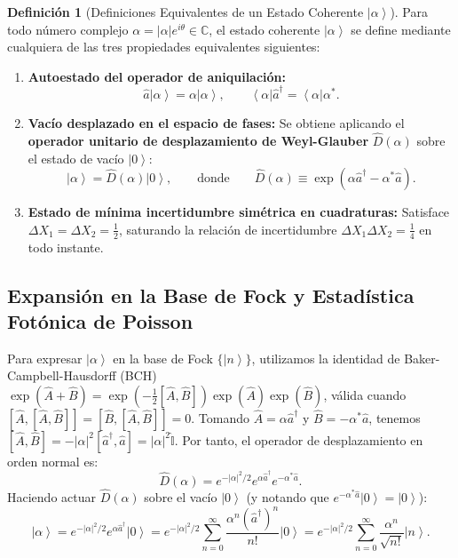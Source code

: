 \documentclass[11pt,a4paper,twoside]{report}
\theoremstyle{definition}
\newtheorem{definicion}{Definición}[chapter]
\theoremstyle{plain}
\theoremstyle{remark}
\newcommand{\ket}[1]{\left| #1 \right\rangle}
\newcommand{\bra}[1]{\left\langle #1 \right|}
\newcommand{\comm}[2]{\left[ #1, #2 \right]}
\newcommand{\op}[1]{\hat{#1}}
\newcommand{\ident}{\hat{\mathbb{I}}}
\begin{document}
\begin{definicion}[Definiciones Equivalentes de un Estado Coherente $\ket{\alpha}$]
Para todo número complejo $\alpha = |\alpha|e^{i\theta} \in \mathbb{C}$, el estado coherente $\ket{\alpha}$ se define mediante cualquiera de las tres propiedades equivalentes siguientes:
\begin{enumerate}[label=\textbf{D\arabic*.}]
    \item \textbf{Autoestado del operador de aniquilación:}
    \begin{equation}
        \op{a}\ket{\alpha} = \alpha\ket{\alpha}, \qquad \bra{\alpha}\op{a}^\dagger = \bra{\alpha}\alpha^*.
    \end{equation}
    \item \textbf{Vacío desplazado en el espacio de fases:} Se obtiene aplicando el \textbf{operador unitario de desplazamiento de Weyl-Glauber} $\op{D}(\alpha)$ sobre el estado de vacío $\ket{0}$:
    \begin{equation}
        \ket{\alpha} = \op{D}(\alpha)\ket{0}, \qquad \text{donde} \qquad \op{D}(\alpha) \equiv \exp\left(\alpha\op{a}^\dagger - \alpha^*\op{a}\right).
    \end{equation}
    \item \textbf{Estado de mínima incertidumbre simétrica en cuadraturas:} Satisface $\Delta X_1 = \Delta X_2 = \frac{1}{2}$, saturando la relación de incertidumbre $\Delta X_1 \Delta X_2 = \frac{1}{4}$ en todo instante.
\end{enumerate}
\end{definicion}

\subsection{Expansión en la Base de Fock y Estadística Fotónica de Poisson}

Para expresar $\ket{\alpha}$ en la base de Fock $\{\ket{n}\}$, utilizamos la identidad de Baker-Campbell-Hausdorff (BCH) $\exp(\op{A}+\op{B}) = \exp(-\frac{1}{2}\comm{\op{A}}{\op{B}})\exp(\op{A})\exp(\op{B})$, válida cuando $\comm{\op{A}}{\comm{\op{A}}{\op{B}}} = \comm{\op{B}}{\comm{\op{A}}{\op{B}}} = 0$. Tomando $\op{A} = \alpha\op{a}^\dagger$ y $\op{B} = -\alpha^*\op{a}$, tenemos $\comm{\op{A}}{\op{B}} = -|\alpha|^2\comm{\op{a}^\dagger}{\op{a}} = |\alpha|^2\ident$. Por tanto, el operador de desplazamiento en orden normal es:
\begin{equation}
    \op{D}(\alpha) = e^{-|\alpha|^2/2} e^{\alpha\op{a}^\dagger} e^{-\alpha^*\op{a}}.
\end{equation}
Haciendo actuar $\op{D}(\alpha)$ sobre el vacío $\ket{0}$ (y notando que $e^{-\alpha^*\op{a}}\ket{0} = \ket{0}$):
\begin{equation}
    \ket{\alpha} = e^{-|\alpha|^2/2} e^{\alpha\op{a}^\dagger}\ket{0} = e^{-|\alpha|^2/2} \sum_{n=0}^{\infty} \frac{\alpha^n (\op{a}^\dagger)^n}{n!}\ket{0} = e^{-|\alpha|^2/2} \sum_{n=0}^{\infty} \frac{\alpha^n}{\sqrt{n!}}\ket{n}.
\end{equation}
\end{document}
